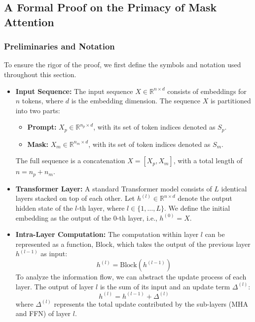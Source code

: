 
\subsection{A Formal Proof on the Primacy of Mask Attention}
\label{the primacy of mask attention}
\subsubsection{Preliminaries and Notation}

To ensure the rigor of the proof, we first define the symbols and notation used throughout this section.
\begin{itemize}
    \item \textbf{Input Sequence:} The input sequence $X \in \mathbb{R}^{n \times d}$ consists of embeddings for $n$ tokens, where $d$ is the embedding dimension. The sequence $X$ is partitioned into two parts:
    \begin{itemize}
        \item \textbf{Prompt:} $X_p \in \mathbb{R}^{n_p \times d}$, with its set of token indices denoted as $S_p$.
        \item \textbf{Mask:} $X_m \in \mathbb{R}^{n_m \times d}$, with its set of token indices denoted as $S_m$.
    \end{itemize}
    The full sequence is a concatenation $X = [X_p, X_m]$, with a total length of $n = n_p + n_m$.

    \item \textbf{Transformer Layer:} A standard Transformer model consists of $L$ identical layers stacked on top of each other. Let $h^{(l)} \in \mathbb{R}^{n \times d}$ denote the output hidden state of the $l$-th layer, where $l \in \{1, \dots, L\}$. We define the initial embedding as the output of the 0-th layer, i.e., $h^{(0)} = X$.

    \item \textbf{Intra-Layer Computation:} The computation within layer $l$ can be represented as a function, $\text{Block}$, which takes the output of the previous layer $h^{(l-1)}$ as input:
    $$h^{(l)} = \text{Block}(h^{(l-1)})$$
    To analyze the information flow, we can abstract the update process of each layer. The output of layer $l$ is the sum of its input and an update term $\Delta^{(l)}$:
    $$h^{(l)} = h^{(l-1)} + \Delta^{(l)}$$
    where $\Delta^{(l)}$ represents the total update contributed by the sub-layers (MHA and FFN) of layer $l$.
\end{itemize}

